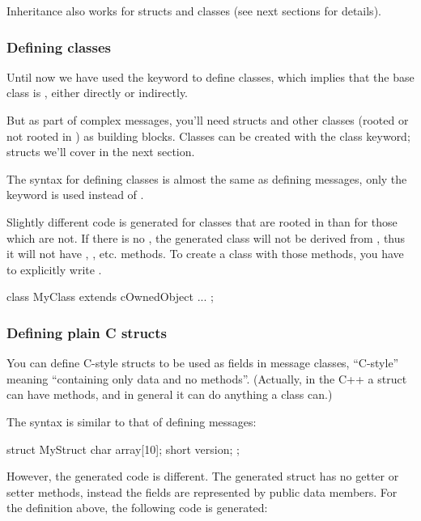 Inheritance also works for structs and classes (see next sections
for details).



\subsubsection{Defining classes}

Until now we have used the  keyword to define classes, which
implies that the base class is , either directly or indirectly.

But as part of complex messages, you'll need structs and other classes
(rooted or not rooted in ) as building blocks.
Classes can be created with the  class keyword;
structs we'll cover in the next section.

The syntax for defining classes is almost the same as defining messages,
only the  keyword is used instead of .

Slightly different code is generated for classes that are rooted in
 than for those which are not.
If there is no , the generated class will not be
derived from , thus it will not have ,
, etc. methods.
To create a class with those methods, you have to explicitly write
.

\begin{msg}
class MyClass extends cOwnedObject
{
    ...
};
\end{msg}



\subsubsection{Defining plain C structs}

You can define C-style structs to be used as fields in message classes,
``C-style'' meaning ``containing only data and no methods''.
(Actually, in the C++ a struct can have methods,
and in general it can do anything a class can.)

The syntax is similar to that of defining messages:

\begin{msg}
struct MyStruct
{
    char array[10];
    short version;
};
\end{msg}

However, the generated code is different. The generated struct has
no getter or setter methods, instead the fields are represented
by public data members. For the definition above, the
following code is generated:

